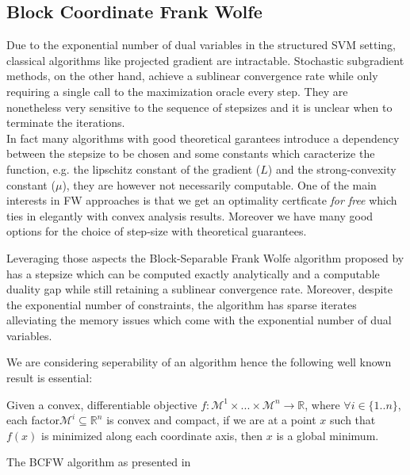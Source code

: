 \subsection{Block Coordinate Frank Wolfe}
Due to the exponential number of dual variables in the structured SVM setting,
classical algorithms like projected gradient are intractable. Stochastic
subgradient methods, on the other hand, achieve a sublinear convergence rate
while only requiring a single call to the maximization oracle every step. They
are nonetheless very sensitive to the sequence of stepsizes and it is unclear
when to terminate the iterations. \\

In fact many algorithms with good theoretical garantees introduce a dependency
between the stepsize to be chosen and some constants which caracterize the
function, e.g. the lipschitz constant of the gradient ($L$) and the
strong-convexity constant ($\mu$), they are however not necessarily computable.
One of the main interests in FW approaches is that we get an optimality
certficate \textit{for free} which ties in elegantly with convex analysis
results. Moreover we have many good options for the choice of step-size with
theoretical guarantees.

Leveraging those aspects the Block-Separable Frank Wolfe algorithm proposed by
\cite{lacoste-julienBlockCoordinateFrankWolfeOptimization2013} has a stepsize
which can be computed exactly analytically and a computable duality gap while
still retaining a sublinear convergence rate. Moreover, despite the exponential
number of constraints, the algorithm has sparse iterates alleviating the memory
issues which come with the exponential number of dual variables.

We are considering seperability of an algorithm hence the following well known
result is essential:
\begin{theorem} Given a convex, differentiable objective
$f:\mathcal{M}^{1}\times...\times\mathcal{M}^{n}\to\mathbb{R}$, where $\forall
i\in\{1..n\}$, each factor\quad $\mathcal{M}^{i}\subseteq\mathbb{R}^{n}$ is
convex and compact, if we are at a point $x$ such that $f(x)$ is minimized along
each coordinate axis, then $x$ is a global minimum.
\end{theorem}


The BCFW algorithm as presented in
\citet{lacoste-julienBlockCoordinateFrankWolfeOptimization2013}

